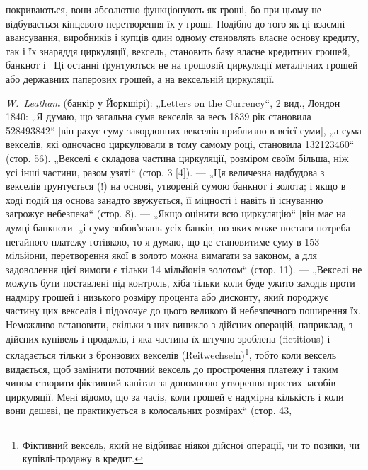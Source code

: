 \parcont{}  %
покриваються, вони абсолютно функціонують як гроші, бо при
цьому не відбувається кінцевого перетворення їх у гроші. Подібно
до того як ці взаємні авансування, виробників і купців
один одному становлять власне основу кредиту, так і їх знаряддя
циркуляції, вексель, становить базу власне кредитних
грошей, банкнот і~ Ці останні ґрунтуються не на грошовій
циркуляції металічних грошей або державних паперових грошей,
а на вексельній циркуляції.

\begin{small}
\disablefootnotebreak{}
\noindent{}\emph{W.~Leatham} (банкір у Йоркшірі): „Letters on the Currency“, 2 вид., Лондон 1840:
„Я думаю, що загальна сума векселів за весь 1839 рік становила \num{528493842}“ [він рахує суму закордонних векселів приблизно в  всієї суми],
„а сума векселів, які одночасно циркулювали в тому самому році, становила
\num{132123460}“ (стор. 56). „Векселі є складова частина циркуляції,
розміром своїм більша, ніж усі інші частини, разом узяті“ (стор. 3 [4]). — „Ця
величезна надбудова з векселів ґрунтується (!) на основі, утвореній сумою
банкнот і золота; і якщо в ході подій ця основа занадто звужується, її міцності
і навіть її існуванню загрожує небезпека“ (стор. 8). — „Якщо оцінити всю
циркуляцію“ [він має на думці банкноти] „і суму зобов’язань усіх банків,
по яких може постати потреба негайного платежу готівкою, то я думаю, що
це становитиме суму в 153 мільйони, перетворення якої в золото можна вимагати
за законом, а для задоволення цієї вимоги є тільки 14 мільйонів золотом“
(стор. 11). — „Векселі не можуть бути поставлені під контроль, хіба тільки
коли буде ужито заходів проти надміру грошей і низького розміру процента
або дисконту, який породжує частину цих векселів і підохочує до цього великого
й небезпечного поширення їх. Неможливо встановити, скільки з них виникло
з дійсних операцій, наприклад, з дійсних купівель і продажів, і яка частина їх
штучно зроблена (fictitious) і складається тільки з бронзових векселів (Reitwechseln)\footnote*{
Фіктивний вексель, який не відбиває ніякої дійсної операції, чи то позики,
чи купівлі-продажу в кредит. 
}, тобто коли
вексель видається, щоб замінити поточний вексель до прострочення платежу і таким чином створити
фіктивний капітал за допомогою утворення простих засобів циркуляції. Мені відомо, що за часів, коли
грошей є надмірна кількість і коли вони дешеві, це практикується в колосальних розмірах“ (стор. 43,

\end{small}
